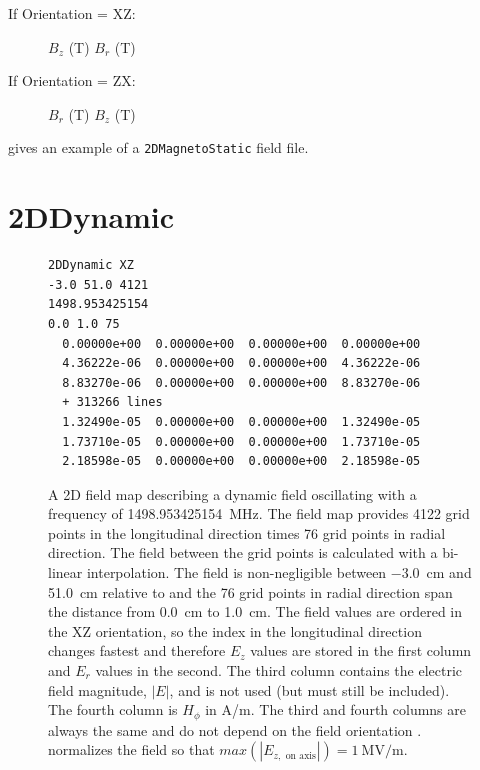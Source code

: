 \begin{description}
\item[If Orientation = XZ:] $B_{z}$ (T) $B_{r}$ (T)
\item[If Orientation = ZX:] $B_{r}$ (T)  $B_{z}$ (T)
\end{description}

 gives an example of a \texttt{2DMagnetoStatic} field file.


\section{2DDynamic}
\label{sec:2DDynamic}
\begin{figure}[h]
  \begin{fmpage}
\begin{verbatim}
2DDynamic XZ
-3.0 51.0 4121
1498.953425154
0.0 1.0 75
  0.00000e+00  0.00000e+00  0.00000e+00  0.00000e+00
  4.36222e-06  0.00000e+00  0.00000e+00  4.36222e-06
  8.83270e-06  0.00000e+00  0.00000e+00  8.83270e-06
  + 313266 lines
  1.32490e-05  0.00000e+00  0.00000e+00  1.32490e-05
  1.73710e-05  0.00000e+00  0.00000e+00  1.73710e-05
  2.18598e-05  0.00000e+00  0.00000e+00  2.18598e-05
\end{verbatim}
  \end{fmpage}
  \caption[Example of a 2DDynamic field map]{A 2D field map describing a dynamic field oscillating with a frequency of
    \SI{1498.953425154}{\mega\hertz}. The field map provides 4122 grid points in the longitudinal direction times 76 grid points in
    radial direction. The field between the grid points is calculated with a bi-linear interpolation. The field is
    non-negligible between \SI{-3.0}{\centi\meter} and \SI{51.0}{\centi\meter} relative to  and the 76 grid points in radial direction
    span the distance from \SI{0.0}{\centi\meter} to \SI{1.0}{\centi\meter}. The field values are ordered in the XZ orientation, so the index in the
    longitudinal direction changes fastest and therefore $E_z$ values are stored in the first column and $E_r$ values
    in the second. The third column contains the electric field magnitude, $|E|$, and is not used (but must still be included).
    The fourth column is $H_{\phi}$ in A/m. The third and fourth columns are always the same and do not depend on the field
    orientation . \opalt normalizes the field so that $max(|E_{z,\text{ on axis}}|) = \SI{1}{\mega\volt\per\meter}$.}
  \label{fig:2DDynamic}
\end{figure}

